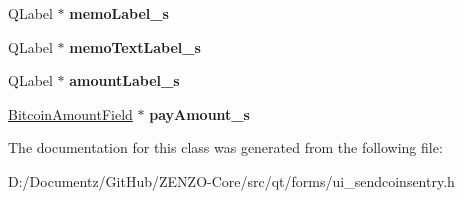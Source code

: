 \begin{DoxyCompactItemize}
\mbox{\label{class_ui___send_coins_entry_a0c2d8f2bde7222473809a3d6f2cc2e59}} 
Q\+Label $\ast$ {\bfseries memo\+Label\+\_\+s}
\item 
\mbox{\label{class_ui___send_coins_entry_a1bd801fabc034748f22e05cb8d353b98}} 
Q\+Label $\ast$ {\bfseries memo\+Text\+Label\+\_\+s}
\item 
\mbox{\label{class_ui___send_coins_entry_a552d1ec92c152b7e4fcbc408de1f87b2}} 
Q\+Label $\ast$ {\bfseries amount\+Label\+\_\+s}
\item 
\mbox{\label{class_ui___send_coins_entry_a5571741bc5e604c5532d126c09932e7f}} 
\mbox{\hyperlink{class_bitcoin_amount_field}{Bitcoin\+Amount\+Field}} $\ast$ {\bfseries pay\+Amount\+\_\+s}
\end{DoxyCompactItemize}


The documentation for this class was generated from the following file\+:\begin{DoxyCompactItemize}
\item 
D\+:/\+Documentz/\+Git\+Hub/\+Z\+E\+N\+Z\+O-\/\+Core/src/qt/forms/ui\+\_\+sendcoinsentry.\+h\end{DoxyCompactItemize}
